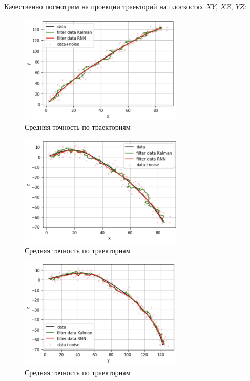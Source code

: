\documentclass[a4paper,11pt]{article} %
\begin{document}
Качественно  посмотрим  на  проекции траекторий на плоскостях $XY$, $XZ$, $YZ$:

\begin{figure}[h!]
\begin{center}
\includegraphics[width=0.7\textwidth]{images/xy.png}
\end{center}
\caption{Средняя точность по траекториям} \label{xy}
\end{figure}

\begin{figure}[h!]
\begin{center}
\includegraphics[width=0.7\textwidth]{images/xz.png}
\end{center}
\caption{Средняя точность по траекториям} \label{xz}
\end{figure}
\newpage
\begin{figure}[h!]
\begin{center}
\includegraphics[width=0.7\textwidth]{images/yz.png}
\end{center}
\caption{Средняя точность по траекториям} \label{yz}
\end{figure}
\end{document}
